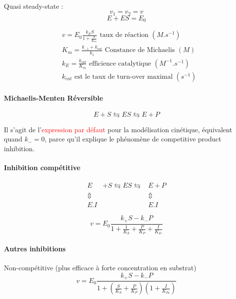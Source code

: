 \paragraph{}Quasi steady-state :
$$v_1=v_2=v$$
$$E + ES = E_0$$

\begin{align*}
&v = E_0 \frac{k_ES}{1+ \frac{S}{K_m}} \text{ taux de réaction } (M.s^{-1}) \\
&K_m = \frac{k_{-1}+k_{cat}}{k_1} \text{ Constance de Michaelis } (M)\\
&k_E =\frac{k_{cat}}{K_m} \text{ efficience catalytique } (M^{-1}.s^{-1})\\
&k_{cat} \text{ est le taux de turn-over maximal } (s^{-1})
\end{align*}

\paragraph{Michaelis-Menten Réversible}

$$E + S \leftrightarrows ES \leftrightarrows E + P$$

\begin{center}\end{center}
\noindent Il s'agit de l'\textcolor{red}{expression par défaut} pour la modélisation cinétique, équivalent quand $k_{-}=0$, parce qu'il explique le phénomène de competitive product inhibition.


\paragraph{Inhibition compétitive}
\begin{align*}
    E & + S 	\leftrightarrows ES \leftrightarrows & E + P \\
    \Updownarrow &  &  \Updownarrow \\
    E.I &  & E.I
\end{align*}



$$v = E_0 \frac{k_+S- k_-P}{1 + \frac{1}{K_S} + \frac{P}{K_P} + \frac{I}{K_{Ic}}}$$


\paragraph{Autres inhibitions}
\paragraph{}\noindent Non-compétitive (plus efficace à forte concentration en substrat)
$$v=E_0 \frac{k_+S-k_-P}{1+(\frac{S}{K_S}+\frac{P}{K_P})(1+\frac{I}{K_{Iu}})}$$


